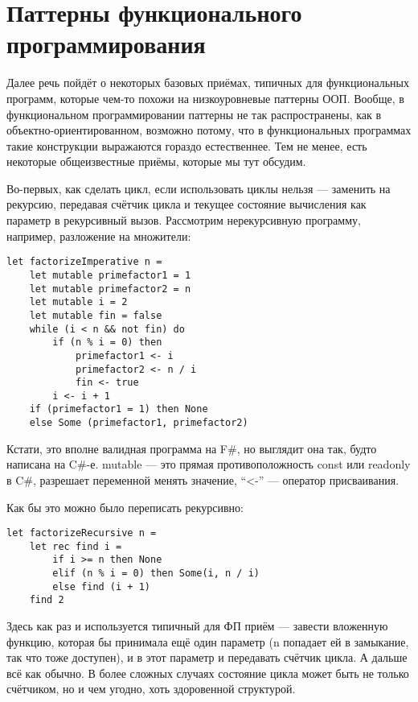 \documentclass[a5paper]{article}
\begin{document}
\section{Паттерны функционального программирования}

Далее речь пойдёт о некоторых базовых приёмах, типичных для функциональных программ, которые чем-то похожи на низкоуровневые паттерны ООП. Вообще, в функциональном программировании паттерны не так распространены, как в объектно-ориентированном, возможно потому, что в функциональных программах такие конструкции выражаются гораздо естественнее. Тем не менее, есть некоторые общеизвестные приёмы, которые мы тут обсудим.

Во-первых, как сделать цикл, если использовать циклы нельзя --- заменить на рекурсию, передавая счётчик цикла и текущее состояние вычисления как параметр в рекурсивный вызов. Рассмотрим нерекурсивную программу, например, разложение на множители:

\begin{verbatim}
let factorizeImperative n =
    let mutable primefactor1 = 1
    let mutable primefactor2 = n
    let mutable i = 2
    let mutable fin = false
    while (i < n && not fin) do
        if (n % i = 0) then
            primefactor1 <- i
            primefactor2 <- n / i
            fin <- true
        i <- i + 1
    if (primefactor1 = 1) then None
    else Some (primefactor1, primefactor2)
\end{verbatim}

Кстати, это вполне валидная программа на F\#, но выглядит она так, будто написана на C\#-е. mutable --- это прямая противоположность const или readonly в C\#, разрешает переменной менять значение, ``<-'' --- оператор присваивания.

Как бы это можно было переписать рекурсивно:

\begin{verbatim}
let factorizeRecursive n =
    let rec find i =
        if i >= n then None
        elif (n % i = 0) then Some(i, n / i)
        else find (i + 1)
    find 2
\end{verbatim}

Здесь как раз и используется типичный для ФП приём --- завести вложенную функцию, которая бы принимала ещё один параметр (n попадает ей в замыкание, так что тоже доступен), и в этот параметр и передавать счётчик цикла. А дальше всё как обычно. В более сложных случаях состояние цикла может быть не только счётчиком, но и чем угодно, хоть здоровенной структурой.
\end{document}
